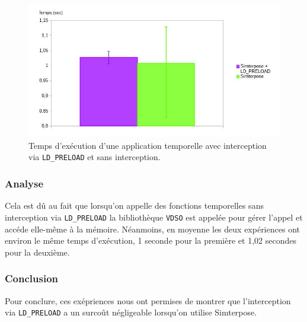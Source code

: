 \begin{figure}[H]
  \centering
    \includegraphics[scale=0.50]{mesures/graph/global_time.jpg}
    \caption{Temps d'exécution d'une application temporelle avec interception via \texttt{LD\_PRELOAD} et sans interception.}
    \label{Temps_FM}
\end{figure}

\subsubsection{Analyse}
Cela est dû au fait que lorsqu'on appelle des fonctions temporelles sans interception via \texttt{LD\_PRELOAD} la bibliothèque \texttt{VDSO} est appelée pour gérer l'appel et accéde elle-même à la mémoire. Néanmoins, en moyenne les deux expériences ont environ le même temps d'exécution, 1 seconde pour la première et 1,02 secondes pour la deuxième.

\subsubsection{Conclusion}
Pour conclure, ces exépriences nous ont permises de montrer que l'interception via \texttt{LD\_PRELOAD} a un surcoût négligeable lorsqu'on utilise Simterpose.


